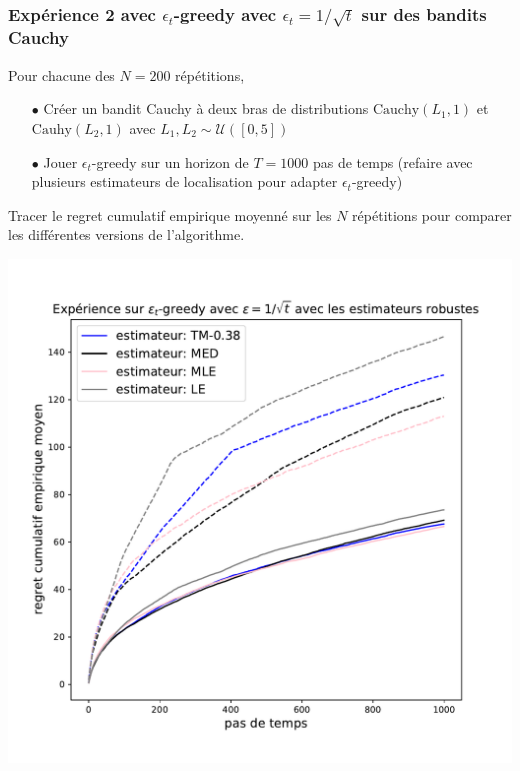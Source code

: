 \documentclass[8pt,sans,aspectratio=169]{beamer}
\begin{document}
\begin{frame}

\frametitle{Expérience 2 avec $\epsilon_t$-greedy avec $\epsilon_t=1/\sqrt{t}$ sur des bandits Cauchy}

Pour chacune des $N=200$ répétitions,\\

\begin{itemize}

\item[$\bullet$] Créer un bandit Cauchy à deux bras de distributions $\mathrm{Cauchy}(L_1,1)$ et $\mathrm{Cauhy}(L_2,1)$ avec $L_1,L_2\sim\mathcal{U}([0,5])$

\item[$\bullet$] Jouer $\epsilon_t$-greedy sur un horizon de $T=1000$ pas de temps (refaire avec plusieurs estimateurs de localisation pour adapter $\epsilon_t$-greedy)
\end{itemize}

Tracer le regret cumulatif empirique moyenné sur les $N$ répétitions pour comparer les différentes versions de l'algorithme.

\begin{center}
\includegraphics[scale=0.3]{experience-epsilon-t-greedy-2.pdf}
\end{center}

\end{frame}
\end{document}
